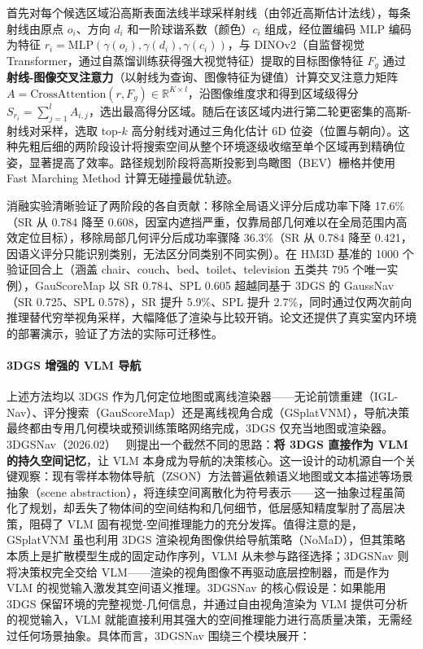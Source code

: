 首先对每个候选区域沿高斯表面法线半球采样射线（由邻近高斯估计法线），每条射线由原点 $o_i$、方向 $d_i$ 和一阶球谐系数（颜色）$c_i$ 组成，经位置编码 MLP 编码为特征 $r_i = \text{MLP}(\gamma(o_i), \gamma(d_i), \gamma(c_i))$，与 DINOv2（自监督视觉Transformer，通过自蒸馏训练获得强大视觉特征）提取的目标图像特征 $F_g$ 通过\textbf{射线-图像交叉注意力}（以射线为查询、图像特征为键值）计算交叉注意力矩阵 $A = \text{CrossAttention}(r, F_g) \in \mathbb{R}^{K \times l}$，沿图像维度求和得到区域级得分 $S_{r_i} = \sum_{j=1}^{l} A_{i,j}$，选出最高得分区域。随后在该区域内进行第二轮更密集的高斯-射线对采样，选取 top-$k$ 高分射线对通过三角化估计 6D 位姿（位置与朝向）。这种先粗后细的两阶段设计将搜索空间从整个环境逐级收缩至单个区域再到精确位姿，显著提高了效率。路径规划阶段将高斯投影到鸟瞰图（BEV）栅格并使用 Fast Marching Method 计算无碰撞最优轨迹。

消融实验清晰验证了两阶段的各自贡献：移除全局语义评分后成功率下降 17.6\%（SR 从 0.784 降至 0.608，因室内遮挡严重，仅靠局部几何难以在全局范围内高效定位目标），移除局部几何评分后成功率骤降 36.3\%（SR 从 0.784 降至 0.421，因语义评分只能识别类别，无法区分同类别不同实例）。在 HM3D 基准的 1000 个验证回合上（涵盖 chair、couch、bed、toilet、television 五类共 795 个唯一实例），GauScoreMap 以 SR 0.784、SPL 0.605 超越同基于 3DGS 的 GaussNav（SR 0.725、SPL 0.578），SR 提升 5.9\%、SPL 提升 2.7\%，同时通过仅两次前向推理替代穷举视角采样，大幅降低了渲染与比较开销。论文还提供了真实室内环境的部署演示，验证了方法的实际可迁移性。

\paragraph{3DGS 增强的 VLM 导航}

上述方法均以 3DGS 作为几何定位地图或离线渲染器——无论前馈重建（IGL-Nav）、评分搜索（GauScoreMap）还是离线视角合成（GSplatVNM），导航决策最终都由专用几何模块或预训练策略网络完成，3DGS 仅充当地图或渲染器。3DGSNav（2026.02）~\cite{2602_12159} 则提出一个截然不同的思路：\textbf{将 3DGS 直接作为 VLM 的持久空间记忆}，让 VLM 本身成为导航的决策核心。这一设计的动机源自一个关键观察：现有零样本物体导航（ZSON）方法普遍依赖语义地图或文本描述等场景抽象（scene abstraction），将连续空间离散化为符号表示——这一抽象过程虽简化了规划，却丢失了物体间的空间结构和几何细节，低层感知精度掣肘了高层决策，阻碍了 VLM 固有视觉-空间推理能力的充分发挥。值得注意的是，GSplatVNM 虽也利用 3DGS 渲染视角图像供给导航策略（NoMaD），但其策略本质上是扩散模型生成的固定动作序列，VLM 从未参与路径选择；3DGSNav 则将决策权完全交给 VLM——渲染的视角图像不再驱动底层控制器，而是作为 VLM 的视觉输入激发其空间语义推理。3DGSNav 的核心假设是：如果能用 3DGS 保留环境的完整视觉-几何信息，并通过自由视角渲染为 VLM 提供可分析的视觉输入，VLM 就能直接利用其强大的空间推理能力进行高质量决策，无需经过任何场景抽象。具体而言，3DGSNav 围绕三个模块展开：

